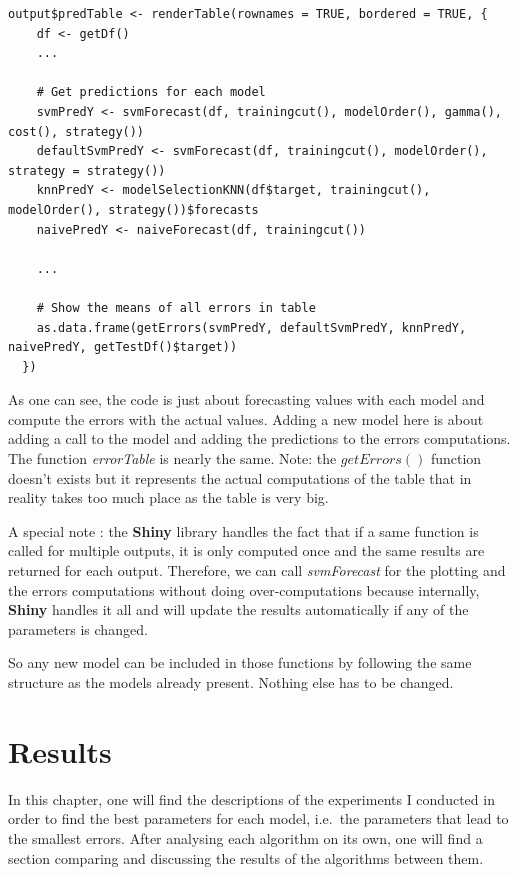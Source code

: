 \documentclass[11pt,a4paper,oneside]{book}
\begin{document}
\begin{lstlisting}
output$predTable <- renderTable(rownames = TRUE, bordered = TRUE, {
    df <- getDf()
    ...
    
    # Get predictions for each model
    svmPredY <- svmForecast(df, trainingcut(), modelOrder(), gamma(), cost(), strategy())
    defaultSvmPredY <- svmForecast(df, trainingcut(), modelOrder(), strategy = strategy())
    knnPredY <- modelSelectionKNN(df$target, trainingcut(), modelOrder(), strategy())$forecasts
    naivePredY <- naiveForecast(df, trainingcut())

    ...
    
    # Show the means of all errors in table
    as.data.frame(getErrors(svmPredY, defaultSvmPredY, knnPredY, naivePredY, getTestDf()$target))
  })
\end{lstlisting}  
  
As one can see, the code is just about forecasting values with each model and compute the errors with the actual values. Adding a new model here is about adding a call to the model and adding the predictions to the errors computations. The function \textit{errorTable} is nearly the same. Note: the $getErrors()$ function doesn't exists but it represents the actual computations of the table that in reality takes too much place as the table is very big. 

A special note : the \textbf{Shiny} library handles the fact that if a same function is called for multiple outputs, it is only computed once and the same results are returned for each output. Therefore, we can call \textit{svmForecast} for the plotting and the errors computations without doing over-computations because internally, \textbf{Shiny} handles it all and will update the results automatically if any of the parameters is changed.

So any new model can be included in those functions by following the same structure as the models already present. Nothing else has to be changed.


\chapter{Results}\label{results}

In this chapter, one will find the descriptions of the experiments I conducted in order to find the best parameters for each model, i.e.\ the parameters that lead to the smallest errors. After analysing each algorithm on its own, one will find a section comparing and discussing the results of the algorithms between them.
\end{document}
